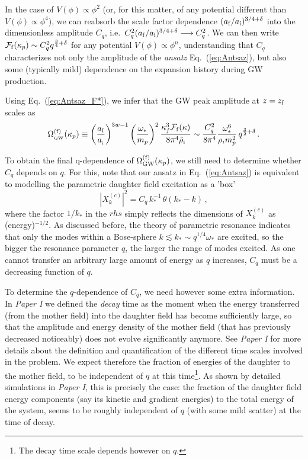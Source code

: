 \documentclass[a4paper,11pt]{article}
\begin{document}
In the case of $V(\phi) \propto \phi^2$ (or, for this matter, of any potential different than $V(\phi) \propto \phi^4$), we can reabsorb the scale factor dependence $({a_{\rm f}/a_{\rm i}})^{3/4+\delta}$ into the dimensionless amplitude $C_q$, i.e.~$C_q^2({a_{\rm f}/a_{\rm i}})^{3/4+\delta} \longrightarrow C_q^2$. We can then write $\mathcal{F}_{\rm f}(\kappa_{p}) \sim C_q^2q^{\frac{3}{4}+\delta}$ for any potential $V(\phi) \propto \phi^n$, understanding that $C_q$ characterizes not only the amplitude of the {\it ansatz} Eq.~(\ref{eq:Antsaz}), but also some (typically mild) dependence on the expansion history during GW production.

Using Eq.~(\ref{eq:Antsaz_F*}), we infer that the GW peak amplitude at $z= z_{\rm f}$ scales as
\begin{eqnarray}\label{eq:PeakAmplitude}
\Omega_{_{\rm GW}}^{({\rm f})}(\kappa_p) \equiv \left(a_{{\rm f}}\over a_{_{\rm i}}\right)^{3w-1}\left(\omega_{*}\over m_p\right)^2{\kappa_f^3 \mathcal{F}_{\rm f}(\kappa)\over 8\pi^4 \tilde \rho_{\rm i}} \sim {C_q^2\over 8\pi^4}\frac{\omega_*^{6}}{\rho_i m_{p}^{2}}\,q^{\frac{3}{2}+\delta}\,.
\end{eqnarray}

To obtain the final q-dependence of $\Omega_{\rm GW}^{\rm (f)}(\kappa_p)$, we still need to determine whether $C_q$ depends on $q$. For this, note that our ansatz in Eq.~(\ref{eq:Antsaz}) is equivalent to modelling the parametric daughter field excitation as a 'box'
\begin{equation}\label{eq:BoxModel}
|X^{(c)}_k|^2 = C_q\,k_*^{-1}\,\theta(k_*-k)\,,
\end{equation}
where the factor $1/k_*$ in the $rhs$ simply reflects the dimensions of $X^{(c)}_k$ as (energy)$^{-1/2}$. As discussed before, the theory of parametric resonance indicates that only the modes within a Bose-sphere $k \lesssim k_* \sim q^{1/4} \omega_*$ are excited, so the bigger the resonance parameter $q$, the larger the range of modes excited.  As one cannot transfer an arbitrary large amount of energy as $q$ increases, $C_q$ must be a decreasing function of $q$. 

To determine the $q$-dependence of $C_q$, we need however some extra information. In {\it Paper I} we defined the {\it decay} time as the moment when the energy transferred (from the mother field) into the daughter field has become sufficiently large, so that the amplitude and energy density of the mother field (that has previously decreased noticeably) does not evolve significantly anymore. See {\it Paper I} for more details about the definition and quantification of the different time scales involved in the problem. We expect therefore the fraction of energies of the daughter to the mother field, to be independent of $q$ at this time\footnote{The decay time scale depends however on $q$.}. As shown by detailed simulations in {\it Paper I}, this is precisely the case: the fraction of the daughter field energy components (say its kinetic and gradient energies) to the total energy of the system, seems to be roughly independent of $q$ (with some mild scatter) at the time of decay. 
 
\end{document}
